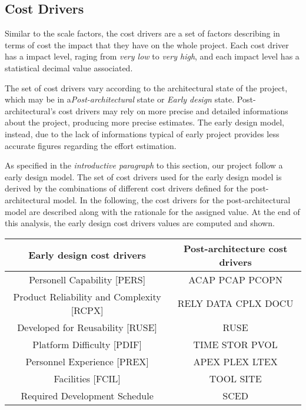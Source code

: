 \subsection{Cost Drivers}

Similar to the scale factors, the cost drivers are a set of factors describing in terms of cost the impact that they have on the whole project.
Each cost driver has a impact level, raging from \textit{very low} to \textit{very high}, and each impact level has a statistical decimal value associated.

The set of cost drivers vary according to the architectural state of the project, which may be in a\textit{Post-architectural} state or \textit{Early design} state.
Post-architectural's cost drivers may rely on more precise and detailed informations about the project, producing more precise estimates. The early design model, instead, due to the lack of informations typical of early project provides less accurate figures regarding the effort estimation.

As specified in the \textit{introductive paragraph} to this section, our project follow a early design model. The set of cost drivers used for the early design model is derived by the combinations of different cost drivers defined for the post-architectural model.
In the following, the cost drivers for the post-architectural model are described along with the rationale for the assigned value.
At the end of this analysis, the early design cost drivers values are computed and shown.

\begin{table}[h!]
	\centering
	\begin{tabular}{|c|c|}
		\hline
		\textbf{Early design cost drivers} & \textbf{Post-architecture cost drivers} \\
		\hline
		Personell Capability [PERS] & ACAP PCAP PCOPN \\
		Product Reliability and Complexity [RCPX] & RELY DATA CPLX DOCU \\
		Developed for Reusability [RUSE] & RUSE \\ 
		Platform Difficulty [PDIF] & TIME STOR PVOL \\
		Personnel Experience [PREX] & APEX PLEX LTEX \\
		Facilities [FCIL] & TOOL SITE \\
		Required Development Schedule & SCED \\
		\hline
	\end{tabular}
\end{table}

